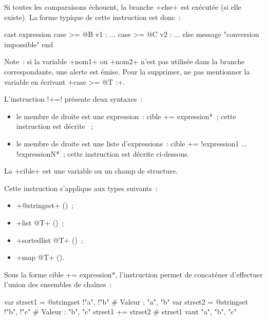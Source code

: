 Si toutes les comparaisons échouent, la branche \ggs+else+ est exécutée (si elle existe). La forme typique de cette instruction est donc~:


\begin{galgasbox}
cast expression
case >= @B v1 :
  ...
case >= @C v2 :
  ...
else
  message "conversion impossible"
end
\end{galgasbox}

Note~: si la variable \ggs+nom1+ ou  \ggs+nom2+ n'est pas utilisée dans la branche correspondante, une alerte est émise. Pour la supprimer, ne pas mentionner la variable en écrivant \ggs+case >= @T :+.










L'instruction \ggs!+=! présente deux syntaxes~:
\begin{itemize}
  \item le membre de droite est une expression~: \ggs*cible += expression*~; cette instruction est décrite ~;
  \item le membre de droite est une liste d'expressions~: \ggs*cible += !expression1 ... !expressionN*~; cette instruction est décrite ci-dessous.
\end{itemize}

La \ggs+cible+ est une variable ou un champ de structure.

Cette instruction s'applique aux types suivants~:
\begin{itemize}
  \item \ggs+@stringset+ ()~;
  \item \ggs+list @T+ ()~;
  \item \ggs+sortedlist @T+ ()~;
  \item \ggs+map @T+ ().
\end{itemize}



Sous la forme \ggs*cible += expression*, l'instruction permet de concaténer d'effectuer l'union des ensembles de chaînes~:
\begin{galgas}
var strset1 = @stringset {!"a", !"b"} # Valeur : "a", "b"
var strset2 = @stringset {!"b", !"c"} # Valeur : "b", "c"
strset1 += strset2 # strset1 vaut "a", "b", "c"
\end{galgas}

